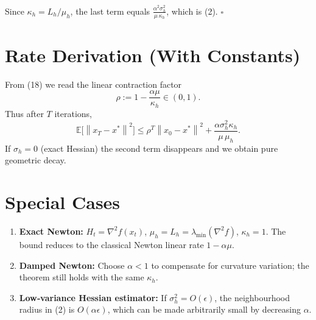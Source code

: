 \documentclass{article}
\newcommand{\E}{\mathbb{E}}
\newcommand{\norm}[1]{\left\|#1\right\|}
\begin{document}
Since $\kappa_{h}=L_{h}/\mu_{h}$, the last term equals $\frac{\alpha^{2}\sigma_{h}^{2}}{\mu\,\kappa_{h}}$, which is (2). \hfill $\square$

\section*{Rate Derivation (With Constants)}
From (18) we read the linear contraction factor
\[
\rho:=1-\frac{\alpha\mu}{\kappa_{h}}\in(0,1).
\]
Thus after $T$ iterations,
\[
\E\!\big[\norm{x_{T}-x^{*}}^{2}\big]\le\rho^{T}\norm{x_{0}-x^{*}}^{2}
+\frac{\alpha\sigma_{h}^{2}\kappa_{h}}{\mu\,\mu_{h}}.
\]
If $\sigma_{h}=0$ (exact Hessian) the second term disappears and we obtain pure geometric decay.

\section*{Special Cases}
\begin{enumerate}
\item \textbf{Exact Newton:} $H_{t}=\nabla^{2}f(x_{t})$, $\mu_{h}=L_{h}= \lambda_{\min}(\nabla^{2}f)$, $\kappa_{h}=1$. The bound reduces to the classical Newton linear rate $1-\alpha\mu$.
\item \textbf{Damped Newton:} Choose $\alpha<1$ to compensate for curvature variation; the theorem still holds with the same $\kappa_{h}$.
\item \textbf{Low‑variance Hessian estimator:} If $\sigma_{h}^{2}=O(\epsilon)$, the neighbourhood radius in (2) is $O(\alpha\epsilon)$, which can be made arbitrarily small by decreasing $\alpha$.
\end{enumerate}
\end{document}

